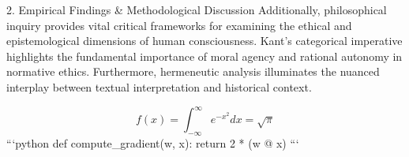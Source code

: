 2. Empirical Findings & Methodological Discussion
Additionally, philosophical inquiry provides vital critical frameworks for examining the ethical and epistemological dimensions of human consciousness. Kant's categorical imperative highlights the fundamental importance of moral agency and rational autonomy in normative ethics. Furthermore, hermeneutic analysis illuminates the nuanced interplay between textual interpretation and historical context.

$$ f(x) = \int_{-\infty}^{\infty} e^{-x^2} dx = \sqrt{\pi} $$ 
```python
def compute_gradient(w, x):
    return 2 * (w @ x)
```